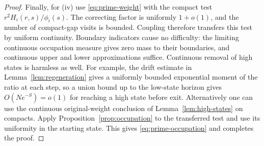 \begin{proof}
Finally, for (iv) use \eqref{eq:prime-weight} with the compact test
$r^2H_i(r,s)/\phi_i(s)$.  The correcting factor is uniformly $1+o(1)$,
and the number of compact-gap visits is bounded.  Coupling therefore
transfers this test by uniform continuity.  Boundary indicators cause
no difficulty: the limiting continuous occupation measure gives zero
mass to their boundaries, and continuous upper and lower
approximations suffice.  Continuous removal of high states is
harmless as well.  For example, the drift estimate in
Lemma~\ref{lem:regeneration} gives a uniformly bounded exponential
moment of the ratio at each step, so a union bound up to the low-state
horizon gives $O(Ne^{-S})=o(1)$ for reaching a high state before exit.
Alternatively one can use the continuous original-weight conclusion
of Lemma~\ref{lem:high-states} on compacts.  Apply
Proposition~\ref{prop:occupation} to the transferred test and use its
uniformity in the starting state.  This gives
\eqref{eq:prime-occupation} and completes the proof.
\end{proof}
